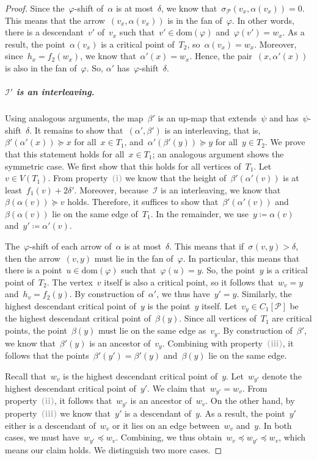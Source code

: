 \documentclass[a4paper,UKenglish, autoref, thm-restate, cleveref]{lipics-v2021}
\newcommand{\dom}{\mathrm{dom}}
\newcommand{\shift}[1]{\sigma_{#1}}
\renewcommand{\phi}{\varphi}
\newcommand{\I}{\mathcal{I}}
\renewcommand{\P}{\mathcal{P}}
\newcommand{\enumit}[1]{\textcolor{darkgray}{\sffamily\bfseries\upshape\mathversion{bold}#1}}
\begin{document}
\begin{proof}
Since the~$\phi$-shift of~$\alpha$ is at most~$\delta$, we know that~$\shift{\P}(v_x, \alpha(v_x)) = 0$.
This means that the arrow~$(v_x, \alpha(v_x))$ is in the fan of~$\phi$.
In other words, there is a descendant~$v'$ of~$v_x$ such that~$v' \in \dom(\phi)$ and~$\phi(v') = w_x$.
As a result, the point~$\alpha(v_x)$ is a critical point of~$T_2$, so~$\alpha(v_x) = w_x$.
Moreover, since~$h_x = f_2(w_x)$, we know that~$\alpha'(x) = w_x$.
Hence, the pair~$(x, \alpha'(x))$ is also in the fan of~$\phi$.
So, $\alpha'$ has~$\phi$-shift~$\delta$.
    
\subparagraph*{$\I'$ is an interleaving.}
Using analogous arguments, the map~$\beta'$ is an up-map that extends~$\psi$ and has~$\psi$-shift~$\delta$.
    It remains to show that~$(\alpha', \beta')$ is an interleaving, that is,~$\beta'(\alpha'(x)) \succeq x$ for all~$x \in T_1$, and~$\alpha'(\beta'(y)) \succeq y$ for all~$y \in T_2$.
    We prove that this statement holds for all~$x \in T_1$; an analogous argument shows the symmetric case.
    We first show that this holds for all vertices of~$T_1$.
    Let~$v \in V(T_1)$.
	From property~\enumit{(i)} we know that the height of~$\beta'(\alpha'(v))$ is at least~$f_1(v) + 2\delta'$.
	Moreover, because~$\I$ is an interleaving, we know that~$\beta(\alpha(v)) \succeq v$ holds.
	Therefore, it suffices to show that~$\beta'(\alpha'(v))$ and~$\beta(\alpha(v))$ lie on the same edge of~$T_1$.
	In the remainder, we use~$y \coloneqq \alpha(v)$ and~$y' \coloneqq \alpha'(v)$.

    \proofsubparagraph{Case $\shift{}(v, y) > \delta$.}
	The~$\phi$-shift of each arrow of~$\alpha$ is at most~$\delta$.
    This means that if~$\shift{}(v, y) > \delta$, then the arrow~$(v, y)$ must lie in the fan of~$\phi$.
	In particular, this means that there is a point~$u \in \dom(\phi)$ such that~$\phi(u) = y$.
    So, the point~$y$ is a critical point of~$T_2$.
	The vertex~$v$ itself is also a critical point, so it follows that~$w_v = y$ and~$h_v = f_2(y)$.
	By construction of~$\alpha'$, we thus have~$y' = y$.
	Similarly, the highest descendant critical point of~$y$ is the point~$y$ itself.
	Let~$v_y \in C_1[\P]$ be the highest descendant critical point of~$\beta(y)$.
    Since all vertices of~$T_1$ are critical points, the point~$\beta(y)$ must lie on the same edge as~$v_y$.
	By construction of~$\beta'$, we know that~$\beta'(y)$ is an ancestor of~$v_y$.
	Combining with property~\enumit{(iii)}, it follows that the points~$\beta'(y') = \beta'(y)$ and~$\beta(y)$ lie on the same edge.

    \proofsubparagraph{Case $\shift{}(v, y) \le \delta$.}
	Recall that~$w_v$ is the highest descendant critical point of~$y$.
	Let~$w_{y'}$ denote the highest descendant critical point of~$y'$.
	We claim that~$w_{y'} = w_v$.
    From property~\enumit{(ii)}, it follows that~$w_{y'}$ is an ancestor of~$w_v$.
	On the other hand, by property~\enumit{(iii)} we know that~$y'$ is a descendant of~$y$.
    As a result, the point~$y'$ either is a descendant of~$w_v$ or it lies on an edge between~$w_v$ and~$y$.
    In both cases, we must have~$w_{y'} \preceq w_v$.
    Combining, we thus obtain~$w_v \preceq w_{y'} \preceq w_v$, which means our claim holds.
    We distinguish two more cases.
    

\end{proof}
\end{document}
